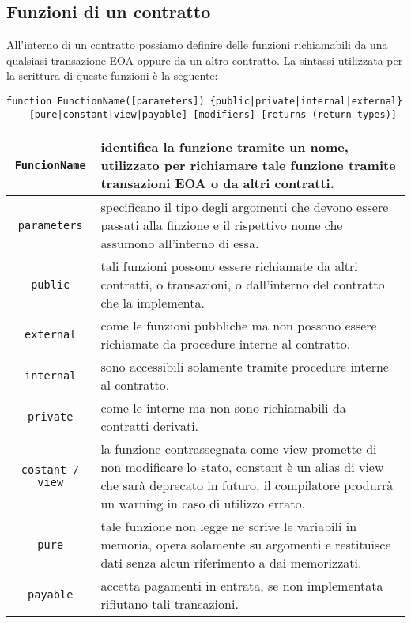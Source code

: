\subsection{Funzioni di un contratto}
All'interno di un contratto possiamo definire delle funzioni richiamabili da una qualsiasi transazione EOA oppure da un altro contratto. La sintassi utilizzata per la scrittura di queste funzioni è la seguente:
%
\begin{lstlisting}
function FunctionName([parameters]) {public|private|internal|external}
	[pure|constant|view|payable] [modifiers] [returns (return types)]
\end{lstlisting}
%
\begin{table}[h]
	\centering
	\begin{tabular}{|c|p{10.5cm}|}
		\hline
		\lstinline|FuncionName| & identifica la funzione tramite un nome, utilizzato per richiamare tale funzione tramite transazioni EOA o da altri contratti.\\ \hline
		\lstinline|parameters| & specificano il tipo degli argomenti che devono essere passati alla finzione e il rispettivo nome che assumono all'interno di essa.\\ \hline
		\lstinline|public| & tali funzioni possono essere richiamate da altri contratti, o transazioni, o dall'interno del contratto che la implementa.\\ \hline
		\lstinline|external| & come le funzioni pubbliche ma non possono essere richiamate da procedure interne al contratto.\\ \hline
		\lstinline|internal| & sono accessibili solamente tramite procedure interne al contratto.\\ \hline
		\lstinline|private| & come le interne ma non sono richiamabili da contratti derivati.\\ \hline
		\lstinline|costant / view| & la funzione contrassegnata come view promette di non modificare lo stato, constant è un alias di view che sarà deprecato in futuro, il compilatore produrrà un warning in caso di utilizzo errato.\\ \hline
		\lstinline|pure| & tale funzione non legge ne scrive le variabili in memoria, opera solamente su argomenti e restituisce dati senza alcun riferimento a dai memorizzati.\\ \hline
		\lstinline|payable| & accetta pagamenti in entrata, se non implementata rifiutano tali transazioni. \\ \hline
	\end{tabular}
\end{table}
%
